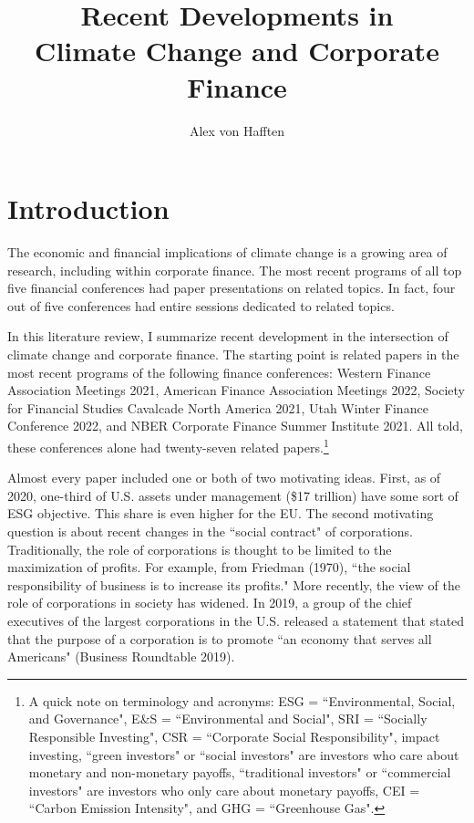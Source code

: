 \documentclass{article}
\title{Recent Developments in \\ Climate Change and Corporate Finance}
\author{Alex von Hafften}
\begin{document}
\maketitle

\section*{Introduction}


The economic and financial implications of climate change is a growing area of research, including within corporate finance. The most recent programs of all top five financial conferences had paper presentations on related topics. In fact, four out of five conferences had entire sessions dedicated to related topics.

\bigskip

In this literature review, I summarize recent development in the intersection of climate change and corporate finance.  The starting point is related papers in the most recent programs of the following finance conferences: Western Finance Association Meetings 2021, American Finance Association Meetings 2022, Society for Financial Studies Cavalcade North America 2021, Utah Winter Finance Conference 2022, and NBER Corporate Finance Summer Institute 2021. All told, these conferences alone had twenty-seven related papers.\footnote{A quick note on terminology and acronyms: ESG = ``Environmental, Social, and Governance", E\&S = ``Environmental and Social",  SRI = ``Socially Responsible Investing", CSR = ``Corporate Social Responsibility", impact investing, ``green investors" or ``social investors" are investors who care about monetary and non-monetary payoffs, ``traditional investors" or ``commercial investors" are investors who only care about monetary payoffs, CEI = ``Carbon Emission Intensity", and GHG = ``Greenhouse Gas".}

\bigskip

Almost every paper included one or both of two motivating ideas.  First, as of 2020, one-third of U.S. assets under management (\$17 trillion) have some sort of ESG objective.  This share is even higher for the EU.  The second motivating question is about recent changes in the ``social contract" of corporations.  Traditionally, the role of corporations is thought to be limited to the maximization of profits.  For example, from Friedman (1970), ``the social responsibility of business is to increase its profits."  More recently, the view of the role of corporations in society has widened. In 2019, a group of the chief executives of the largest corporations in the U.S. released a statement that stated that the purpose of a corporation is to promote ``an economy that serves all Americans" (Business Roundtable 2019).
\end{document}
